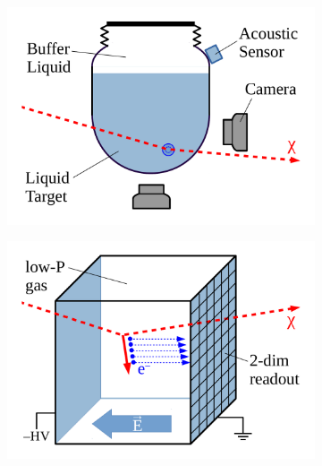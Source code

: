 \begin{figure}[!ht]
\begin{subfigure}{0.49\textwidth}
         \includegraphics[width=\textwidth]{figures/DMOverview/bubble.pdf}
         \caption{}
         \label{fig:DMOverview/bubble}
     \end{subfigure}
     \hfill
     \begin{subfigure}{0.49\textwidth}
         \centering
         \includegraphics[width=\textwidth]{figures/DMOverview/directional.pdf}
         \caption{}
         \label{fig:DMOverview/directional}
     \end{subfigure}
     \hfill
     \begin{subfigure}{0.49\textwidth}
         \centering

\end{subfigure}
\end{figure}

